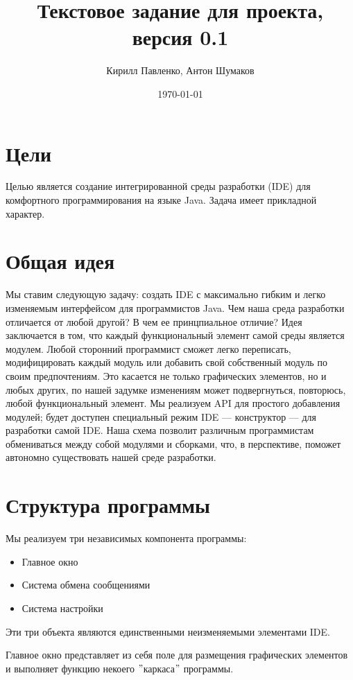 \documentclass[12pt]{article}
\begin{document}
\title{Текстовое задание для проекта, версия 0.1}
\author{Кирилл Павленко, Антон Шумаков}
\date{\today}
\maketitle
\newpage

\section{Цели}
Целью является создание интегрированной среды разработки (IDE) для комфортного программирования на языке Java. Задача имеет прикладной характер.

\section{Общая идея}
Мы ставим следующую задачу: создать IDE с максимально гибким и легко изменяемым интерфейсом для программистов Java. Чем наша среда разработки отличается от любой другой? В чем ее принцпиальное отличие? Идея заключается в том, что каждый функциональный элемент самой среды является модулем. Любой сторонний программист сможет легко переписать, модифицировать каждый модуль или добавить свой собственный модуль по своим предпочтениям. Это касается не только графических элементов, но и любых других, по нашей задумке изменениям может подвергнуться, повторюсь, любой функциональный элемент. Мы реализуем API для простого добавления модулей; будет доступен специальный режим IDE --- конструктор --- для разработки самой IDE. Наша схема позволит различным программистам обмениваться между собой модулями и сборками, что, в перспективе, поможет автономно существовать нашей среде разработки.

\section{Структура программы}
Мы реализуем три независимых компонента программы:
\begin{itemize}
\item Главное окно
\item Система обмена сообщениями
\item Система настройки
\end{itemize}
Эти три объекта являются единственными неизменяемыми элементами IDE. 

Главное окно представляет из себя поле для размещения графических элементов и выполняет функцию некоего $"$каркаса$"$ программы. 
\end{document}
